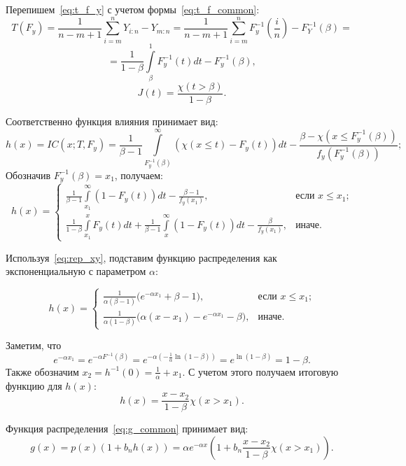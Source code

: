 \documentclass[12pt, specialist, subf, substylefile = spbu.rtx]{disser}
\begin{document}
Перепишем~\eqref{eq:t_f_y} с учетом формы~\eqref{eq:t_f_common}:
$$
T(F_y)=\frac{1}{n-m+1} \sum\limits_{i=m}^n Y_{i:n}-Y_{m:n}=
\frac{1}{n-m+1} \sum\limits_{i=m}^n F_y^{-1}(\frac{i}{n})-F_Y^{-1}(\beta)=
$$
\begin{equation}\label{eq:t_hill_res}
=\frac{1}{1-\beta} \int\limits_\beta^1 F_y^{-1}(t) dt-F_y^{-1}(\beta),
\end{equation}
\begin{equation}\label{eq:jt}
J(t)=\frac{\chi(t>\beta)}{1-\beta}.
\end{equation}

Соответственно функция влияния принимает вид:
$$
h(x)=IC(x; T, F_y)=\frac{1}{\beta-1}\int\limits_{F_y^{-1}(\beta)}^\infty 
(\chi(x \le t) - F_y(t))dt- \frac{\beta-\chi(x \le F_y^{-1}(\beta))}{f_y(F_y^{-1}(\beta))};
$$
Обозначив $F_y^{-1}(\beta)=x_1$, получаем:
\begin{equation}\label{eq:h_cases}
h(x)=
\begin{cases}
\frac{1}{\beta-1}\int\limits_{x_1}^\infty (1-F_y(t))dt-\frac{\beta-1}{f_y(x_1)}, 
	&\text{если $x \le x_1$;} \\
\frac{1}{1-\beta}\int\limits_{x_1}^x F_y(t)dt+\frac{1}{\beta-1}\int\limits_x^\infty(1-F_y(t))dt-\frac{\beta}{f_y(x_1)} , 
	&\text{иначе.}
\end{cases}
\end{equation}

Используя~\eqref{eq:rep_xy}, подставим функцию распределения как экспоненциальную с параметром $\alpha$:

\begin{equation*}
h(x)=
\begin{cases}
\frac{1}{\alpha(\beta-1)}\big(e^{-\alpha x_1} +\beta-1\big),
	&\text{если $x \le x_1$;}\\
\frac{1}{\alpha(1-\beta)}\big(\alpha(x-x_1)- e^{-\alpha x_1}-\beta\big),
	&\text{иначе.}
\end{cases}
\end{equation*}

Заметим, что 
$$
e^{-\alpha x_1}=
e^{-\alpha F^{-1}(\beta)}=
e^{-\alpha \left(-\frac{1}{\alpha}\ln(1-\beta)\right)}=
e^{\ln(1-\beta)}=
1-\beta.
$$
Также обозначим $x_2=h^{-1}(0)=\frac{1}{\alpha}+x_1$. С учетом этого получаем итоговую функцию для $h(x)$:
\begin{equation*}
h(x)=\frac{x-x_2}{1-\beta}\chi(x>x_1).
\end{equation*}

Функция распределения~\eqref{eq:g_common} принимает вид:
\begin{equation}\label{eq:g_final}
g(x) = p(x)(1+b_nh(x))=\alpha e^{-\alpha x}\left(1 + b_n\frac{x-x_2}{1-\beta}\chi(x > x_1) \right).
\end{equation}
\end{document}
